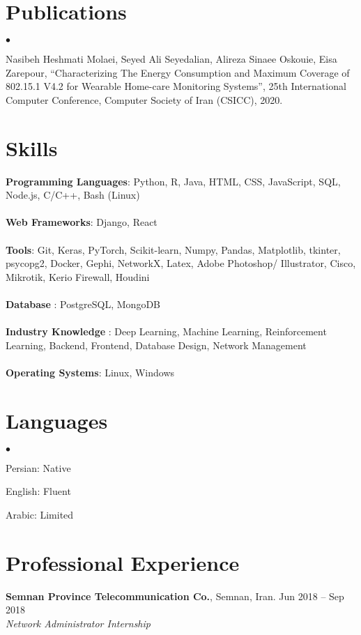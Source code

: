 \documentclass[margin,line]{res}
\newenvironment{list2}{
  \begin{list}{$\bullet$}{%
      \setlength{\itemsep}{0in}
      \setlength{\parsep}{0in} \setlength{\parskip}{0in}
      \setlength{\topsep}{0in} \setlength{\partopsep}{0in}
      \setlength{\leftmargin}{0.2in}}}{\end{list}}
\begin{document}
\begin{resume}
\section{\sc Publications}
\begin{list2}
	\item Nasibeh Heshmati Molaei, Seyed Ali Seyedalian, Alireza Sinaee Oskouie, Eisa Zarepour, “Characterizing
	The Energy Consumption and Maximum Coverage of 802.15.1 V4.2 for Wearable Home-care Monitoring
	Systems”, 25th International Computer Conference, Computer Society of Iran (CSICC), 2020.
\end{list2}

\section{\sc Skills}
{\bf Programming  Languages}:  
Python, R, Java, HTML, CSS, JavaScript,  SQL, Node.js, C/C++, Bash (Linux)\\ \\ 
{\bf Web Frameworks}: 
Django, React\\ \\
{\bf Tools}: 
Git, Keras, PyTorch, Scikit-learn, Numpy, Pandas, Matplotlib, tkinter, psycopg2, Docker,  Gephi, NetworkX,  Latex, Adobe Photoshop/ Illustrator, Cisco, Mikrotik, Kerio Firewall, Houdini \\ \\
{\bf Database }: PostgreSQL, MongoDB \\ \\ 
{\bf Industry Knowledge} : Deep Learning, Machine Learning, Reinforcement Learning, Backend, Frontend, Database Design, Network Management\\ \\
{\bf Operating Systems}: 
Linux, Windows\\ 
\section{\sc Languages}
\begin{list2} 
	\item  Persian: Native 
	\item English: Fluent
	\item Arabic: Limited 
\end{list2}

\section{\sc Professional Experience}
{\bf Semnan Province Telecommunication Co.}, Semnan, Iran. \hfill{Jun 2018 -- Sep 2018}\\
{\em Network Administrator Internship }\\


\end{resume}
\end{document}
